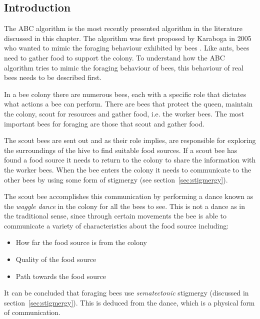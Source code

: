 \subsection{Introduction}
The \gls{ABC} algorithm is the most recently presented algorithm in the literature discussed in this chapter\cite{ABCCompareStudy,ABCLeafConstrained,ABCNumericalOptimization}. The algorithm was first proposed by Karaboga in 2005 who wanted to mimic the foraging behaviour exhibited by bees \cite{ABCCompareStudy,ABCLeafConstrained,ABCNumericalOptimization}. Like ants, bees need to gather food to support the colony. To understand how the \gls{ABC} algorithm tries to mimic the foraging behaviour of bees, this behaviour of real bees needs to be described first\cite{ABCCompareStudy}. 

In a bee colony there are numerous bees, each with a specific role that dictates what actions a bee can perform. There are bees that protect the queen, maintain the colony, scout for resources and gather food, i.e. the worker bees. The most important bees for foraging are those that scout and gather food\cite{ABCCompareStudy}. 

The scout bees are sent out and as their role implies, are responsible for exploring the surroundings of the hive to find suitable food sources\cite{ABCCompareStudy}. If a scout bee has found a food source it needs to return to the colony to share the information with the worker bees\cite{ABCCompareStudy}. When the bee enters the colony it needs to communicate to the other bees by using some form of stigmergy (see section~\ref{sec:stigmergy})\cite{ABCCompareStudy}.

The scout bee accomplishes this communication by performing a dance known as the \emph{waggle dance} in the colony for all the bees to see\cite{ABCCompareStudy}. This is not a dance as in the traditional sense, since through certain movements the bee is able to communicate a variety of characteristics about the food source including\cite{ABCCompareStudy}:
\begin{itemize}
\item How far the food source is from the colony
\item Quality of the food source
\item Path towards the food source
\end{itemize}

It can be concluded that foraging bees use \emph{sematectonic} stigmergy (discussed in section~\ref{sec:stigmergy}). This is deduced from the dance, which is a physical form of communication.


